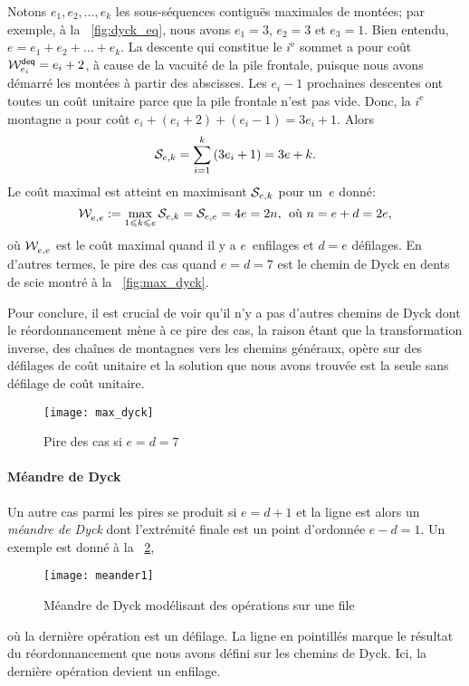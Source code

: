 Notons \(e_1, e_2, \dots, e_k\) les sous-séquences contiguës maximales
de montées; par exemple, à la \fig~\ref{fig:dyck_eq}, nous avons
\(e_1=3\), \(e_2 = 3\) et \(e_3 = 1\). Bien entendu, \(e = e_1 + e_2 +
\dots + e_k\). La descente qui constitue le \(i^\text{e}\) sommet a
pour coût  \(\W{\fun{deq}}{e_i} = e_i +
2\), à cause de la vacuité de la pile frontale, puisque nous avons
démarré les montées à partir des abscisses. Les \(e_i-1\) prochaines
descentes ont toutes un coût unitaire parce que la pile frontale n'est
pas vide. Donc, la \(i^\text{e}\) montagne a pour coût
\(e_i+(e_i+2)+(e_i-1) = 3e_i+1\). Alors
\begin{equation*}
  \A{e,k} = \sum_{i=1}^{k}{(3e_i+1)} = 3e + k.
\end{equation*}
Le coût maximal est atteint en maximisant \(\A{e,k}\) pour un~\(e\)
donné:
\begin{equation*}
\W{}{e,e} := \max_{1 \leqslant k \leqslant e}{\A{e,k}} = \A{e,e} = 4e
= 2n,\,\; \text{où \(n=e+d=2e\)},
\end{equation*}
où \(\W{}{e,e}\) est le coût maximal quand il y a \(e\)~enfilages et
\({d=e}\) défilages. En d'autres termes, le pire des cas quand
\(e=d=7\) est le chemin de Dyck en dents de scie montré à la
\fig~\vref{fig:max_dyck}.

Pour conclure, il est crucial de voir qu'il n'y a pas d'autres chemins
de Dyck dont le réordonnancement mène à ce pire des cas, la raison
étant que la transformation inverse, des chaînes de montagnes vers les
chemins généraux, opère sur des défilages de coût unitaire et la
solution que nous avons trouvée est la seule sans défilage de coût
unitaire.
\begin{figure}
\centering
\texttt{[image: max\_dyck]}
\caption{Pire des cas si \(e=d=7\)}
\label{fig:max_dyck}
\end{figure}

\paragraph{Méandre de Dyck}

Un autre cas parmi les pires se produit si \(e= d + 1\) et la ligne
est alors un \emph{méandre de Dyck} dont l'extrémité finale est un
point d'ordonnée \(e-d=1\). Un exemple est donné à la
\fig~\ref{fig:meander1},
\begin{figure}
\centering
\texttt{[image: meander1]}
\caption{Méandre de Dyck modélisant des opérations sur une file}
\label{fig:meander1}
\end{figure}
où la dernière opération est un défilage. La ligne en pointillés
marque le résultat du réordonnancement que nous avons défini sur les
chemins de Dyck. Ici, la dernière opération devient un enfilage.

